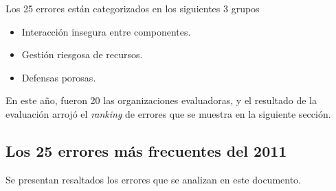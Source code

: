 \documentclass[a4paper,10pt]{article}
\begin{document}
Los 25 errores están categorizados en los siguientes 3 grupos
\begin{itemize}
    \item Interacción insegura entre componentes.
    \item Gestión riesgosa de recursos.
    \item Defensas porosas.
\end{itemize}
 
En este año, fueron 20 las organizaciones evaluadoras, y el resultado de la evaluación arrojó el \emph{ranking} de errores que se muestra
en la siguiente sección.
 
\subsection{Los 25 errores más frecuentes del 2011}
Se presentan resaltados los errores que se analizan en este documento.
\end{document}
